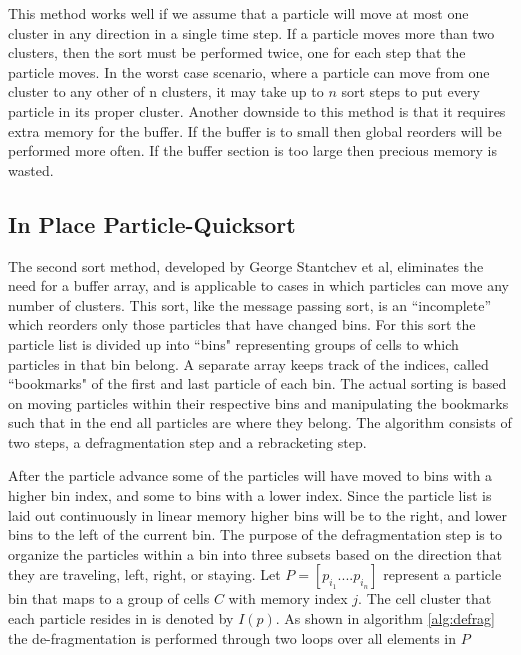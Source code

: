 	This method works well if we assume that a particle will move at most one cluster in any direction in a single time step. If a particle moves more than two clusters, then the sort must be performed twice, one for each step that the particle moves. In the worst case scenario, where a particle can move from one cluster to any other of n clusters, it may take up to $n$ sort steps to put every particle in its proper cluster. Another downside to this method is that it requires extra memory for the buffer. If the buffer is to small then global reorders will be performed more often. If the buffer section is too large then precious memory is wasted. 

	\subsection{In Place Particle-Quicksort}
	The second sort method, developed by George Stantchev et al, eliminates the need for a buffer array, and is applicable to cases in which particles can move any number of clusters. This sort, like the message passing sort, is an ``incomplete'' which reorders only those particles that have changed bins. For this sort the particle list is divided up into ``bins" representing groups of cells to which particles in that bin belong. A separate array keeps track of the indices, called ``bookmarks" of the first and last particle of each bin. The actual sorting is based on moving particles within their respective bins and manipulating the bookmarks such that in the end all particles are where they belong. The algorithm consists of two steps, a defragmentation step and a rebracketing step. 
	
	After the particle advance some of the particles will have moved to bins with a higher bin index, and some to bins with a lower index. Since the particle list is laid out continuously in linear memory higher bins will be to the right, and lower bins to the left of the current bin. The purpose of the defragmentation step is to organize the particles within a bin into three subsets based on the direction that they are traveling, left, right, or staying. Let $P = [p_{i_1}.... p_{i_n}]$ represent a particle bin that maps to a group of cells $C$ with memory index $j$. The cell cluster that each particle resides in is denoted by $I(p)$. As shown in algorithm \ref{alg:defrag} the de-fragmentation is performed through two loops over all elements in $P$

